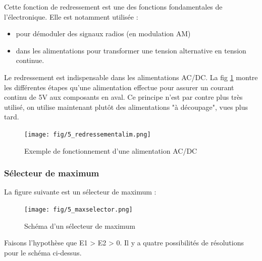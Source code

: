 \documentclass[a4paper]{article}
\begin{document}
    Cette fonction de redressement est une des fonctions fondamentales de l'électronique.
    Elle est notamment utilisée :
    \begin{itemize}
        \item pour démoduler des signaux radios (en modulation AM)
        \item dans les alimentations pour transformer une tension alternative en
        tension continue.
    \end{itemize}

    Le redressement est indispensable dans les alimentations AC/DC. La fig \ref{fig:5_redressementalim} 
    montre les différentes étapes qu'une alimentation effectue pour assurer un 
    courant continu de 5V aux composants en aval. Ce principe n'est par contre
    plus très utilisé, on utilise maintenant plutôt des alimentations "à découpage", 
    vues plus tard.
    \begin{figure}[H]
        \begin{center}
            \texttt{[image: fig/5\_redressementalim.png]}
            \caption{Exemple de fonctionnement d'une alimentation AC/DC}
            \label{fig:5_redressementalim}
        \end{center}
    \end{figure}

    \subsubsection{Sélecteur de maximum}
    La figure suivante est un sélecteur de maximum :
    \begin{figure}[H]
        \begin{center}
            \texttt{[image: fig/5\_maxselector.png]}
            \caption{Schéma d'un sélecteur de maximum}
            \label{fig:5_maxselector}
        \end{center}
    \end{figure}

    Faisons l'hypothèse que E1 > E2 > 0.
    Il y a quatre possibilités de résolutions pour le schéma ci-dessus.
\end{document}
